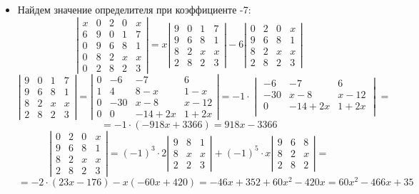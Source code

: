 \documentclass[a4paper,12pt]{article}
\begin{document}
\begin{itemize}
\item Найдем значение определителя при коэффициенте -7:
\[
\left|\begin{matrix}
x & 0 & 2 & 0 & x \\
6 & 9 & 0 & 1 & 7 \\
0 & 9 & 6 & 8 & 1 \\
0 & 8 & 2 & x & x \\
0 & 2 & 8 & 2 & 3
\end{matrix}\right| 
= 
x
\left|\begin{matrix}
9 & 0 & 1 & 7 \\
9 & 6 & 8 & 1 \\
8 & 2 & x & x \\
2 & 8 & 2 & 3
\end{matrix}\right|
- 6 
\left|\begin{matrix}
0 & 2 & 0 & x \\
9 & 6 & 8 & 1 \\
8 & 2 & x & x \\
2 & 8 & 2 & 3
\end{matrix}\right|
\]
\[
\left|\begin{matrix}
9 & 0 & 1 & 7 \\
9 & 6 & 8 & 1 \\
8 & 2 & x & x \\
2 & 8 & 2 & 3
\end{matrix}\right| 
=
\left|\begin{matrix}
0 & -6 & -7 & 6 \\
1 & 4 & 8-x & 1-x \\
0 & -30 & x-8 & x-12 \\
0 & 0 & -14+2x & 1+2x
\end{matrix}\right|
=
-1 \cdot 
\begin{vmatrix}
-6 & -7 & 6\\
-30 &x-8 & x - 12\\
0 & -14+2x & 1+2x\\
\end{vmatrix} =
\]
\[
=
-1 \cdot (-918x + 3366) = 918x - 3366
\]
\[
\left|\begin{matrix}
0 & 2 & 0 & x \\
9 & 6 & 8 & 1 \\
8 & 2 & x & x \\
2 & 8 & 2 & 3
\end{matrix}\right| = 
(-1)^{3} \cdot 2 \left|\begin{matrix}
9 & 8 & 1 \\
8 & x & x \\
2 & 2 & 3
\end{matrix}\right| + (-1)^5 \cdot x \left|\begin{matrix}
9 & 6 & 8 \\
8 & 2 & x \\
2 & 8 & 2
\end{matrix}\right| = 
\]
\[
= -2 \cdot (23x-176) -x (-60x+420) = -46x + 352 + 60x^2 - 420x = 60x^2 -466x + 35
\]


\end{itemize}
\end{document}
